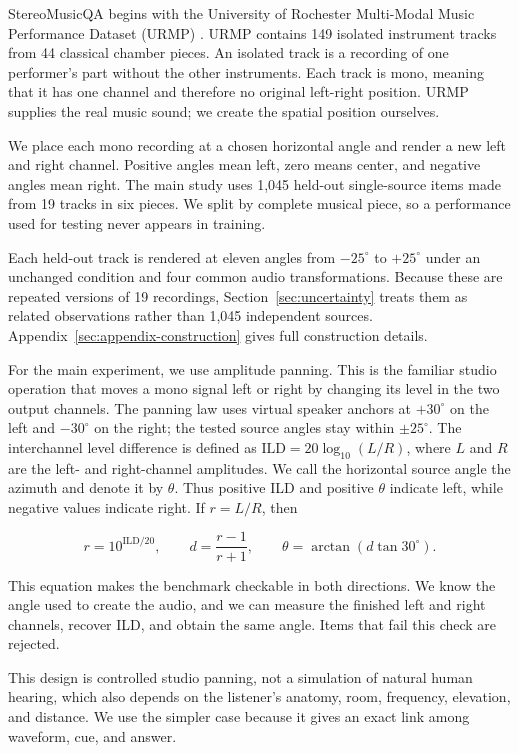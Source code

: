 \documentclass{article}
\begin{document}
StereoMusicQA begins with the University of Rochester Multi-Modal Music Performance Dataset (URMP) \citep{li2019urmp}. URMP contains 149 isolated instrument tracks from 44 classical chamber pieces. An isolated track is a recording of one performer's part without the other instruments. Each track is mono, meaning that it has one channel and therefore no original left-right position. URMP supplies the real music sound; we create the spatial position ourselves.

We place each mono recording at a chosen horizontal angle and render a new left and right channel. Positive angles mean left, zero means center, and negative angles mean right. The main study uses 1,045 held-out single-source items made from 19 tracks in six pieces. We split by complete musical piece, so a performance used for testing never appears in training.

Each held-out track is rendered at eleven angles from \(-25^\circ\) to \(+25^\circ\) under an unchanged condition and four common audio transformations. Because these are repeated versions of 19 recordings, Section~\ref{sec:uncertainty} treats them as related observations rather than 1,045 independent sources. Appendix~\ref{sec:appendix-construction} gives full construction details.

For the main experiment, we use amplitude panning. This is the familiar studio operation that moves a mono signal left or right by changing its level in the two output channels. The panning law uses virtual speaker anchors at \(+30^\circ\) on the left and \(-30^\circ\) on the right; the tested source angles stay within \(\pm25^\circ\). The interchannel level difference is defined as \(\mathrm{ILD}=20\log_{10}(L/R)\), where \(L\) and \(R\) are the left- and right-channel amplitudes. We call the horizontal source angle the azimuth and denote it by \(\theta\). Thus positive ILD and positive \(\theta\) indicate left, while negative values indicate right. If \(r=L/R\), then

\[
r = 10^{\mathrm{ILD}/20}, \qquad
d = \frac{r-1}{r+1}, \qquad
\theta = \arctan\!\left(d\tan 30^\circ\right).
\]

This equation makes the benchmark checkable in both directions. We know the angle used to create the audio, and we can measure the finished left and right channels, recover ILD, and obtain the same angle. Items that fail this check are rejected.

This design is controlled studio panning, not a simulation of natural human hearing, which also depends on the listener's anatomy, room, frequency, elevation, and distance. We use the simpler case because it gives an exact link among waveform, cue, and answer.
\end{document}
